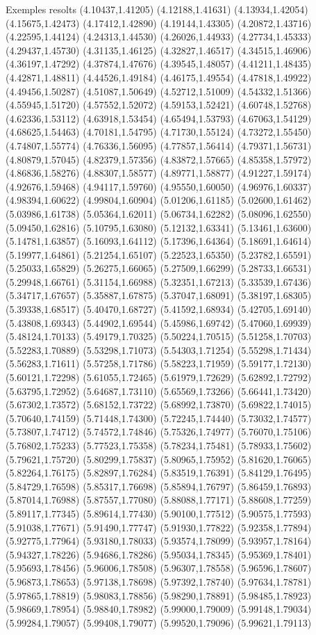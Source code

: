 \documentclass[11pt,a4paper]{article}
\begin{document}
\begin{fmex}{Exemples resolts}
(4.10437,1.41205) (4.12188,1.41631) (4.13934,1.42054) (4.15675,1.42473) (4.17412,1.42890) (4.19144,1.43305) (4.20872,1.43716) (4.22595,1.44124) (4.24313,1.44530) (4.26026,1.44933) (4.27734,1.45333) (4.29437,1.45730) (4.31135,1.46125) (4.32827,1.46517) (4.34515,1.46906) (4.36197,1.47292) (4.37874,1.47676) (4.39545,1.48057) (4.41211,1.48435) (4.42871,1.48811) (4.44526,1.49184) (4.46175,1.49554) (4.47818,1.49922) (4.49456,1.50287) (4.51087,1.50649) (4.52712,1.51009) (4.54332,1.51366) (4.55945,1.51720) (4.57552,1.52072) (4.59153,1.52421) (4.60748,1.52768) (4.62336,1.53112) (4.63918,1.53454) (4.65494,1.53793) (4.67063,1.54129) (4.68625,1.54463) (4.70181,1.54795) (4.71730,1.55124) (4.73272,1.55450) (4.74807,1.55774) (4.76336,1.56095) (4.77857,1.56414) (4.79371,1.56731) (4.80879,1.57045) (4.82379,1.57356) (4.83872,1.57665) (4.85358,1.57972) (4.86836,1.58276) (4.88307,1.58577) (4.89771,1.58877) (4.91227,1.59174) (4.92676,1.59468) (4.94117,1.59760) (4.95550,1.60050) (4.96976,1.60337) (4.98394,1.60622) (4.99804,1.60904) (5.01206,1.61185) (5.02600,1.61462) (5.03986,1.61738) (5.05364,1.62011) (5.06734,1.62282) (5.08096,1.62550) (5.09450,1.62816) (5.10795,1.63080) (5.12132,1.63341) (5.13461,1.63600) (5.14781,1.63857) (5.16093,1.64112) (5.17396,1.64364) (5.18691,1.64614) (5.19977,1.64861) (5.21254,1.65107) (5.22523,1.65350) (5.23782,1.65591) (5.25033,1.65829) (5.26275,1.66065) (5.27509,1.66299) (5.28733,1.66531) (5.29948,1.66761) (5.31154,1.66988) (5.32351,1.67213) (5.33539,1.67436) (5.34717,1.67657) (5.35887,1.67875) (5.37047,1.68091) (5.38197,1.68305) (5.39338,1.68517) (5.40470,1.68727) (5.41592,1.68934) (5.42705,1.69140) (5.43808,1.69343) (5.44902,1.69544) (5.45986,1.69742) (5.47060,1.69939) (5.48124,1.70133) (5.49179,1.70325) (5.50224,1.70515) (5.51258,1.70703) (5.52283,1.70889) (5.53298,1.71073) (5.54303,1.71254) (5.55298,1.71434) (5.56283,1.71611) (5.57258,1.71786) (5.58223,1.71959) (5.59177,1.72130) (5.60121,1.72298) (5.61055,1.72465) (5.61979,1.72629) (5.62892,1.72792) (5.63795,1.72952) (5.64687,1.73110) (5.65569,1.73266) (5.66441,1.73420) (5.67302,1.73572) (5.68152,1.73722) (5.68992,1.73870) (5.69822,1.74015) (5.70640,1.74159) (5.71448,1.74300) (5.72245,1.74440) (5.73032,1.74577) (5.73807,1.74712) (5.74572,1.74846) (5.75326,1.74977) (5.76070,1.75106) (5.76802,1.75233) (5.77523,1.75358) (5.78234,1.75481) (5.78933,1.75602) (5.79621,1.75720) (5.80299,1.75837) (5.80965,1.75952) (5.81620,1.76065) (5.82264,1.76175) (5.82897,1.76284) (5.83519,1.76391) (5.84129,1.76495) (5.84729,1.76598) (5.85317,1.76698) (5.85894,1.76797) (5.86459,1.76893) (5.87014,1.76988) (5.87557,1.77080) (5.88088,1.77171) (5.88608,1.77259) (5.89117,1.77345) (5.89614,1.77430) (5.90100,1.77512) (5.90575,1.77593) (5.91038,1.77671) (5.91490,1.77747) (5.91930,1.77822) (5.92358,1.77894) (5.92775,1.77964) (5.93180,1.78033) (5.93574,1.78099) (5.93957,1.78164) (5.94327,1.78226) (5.94686,1.78286) (5.95034,1.78345) (5.95369,1.78401) (5.95693,1.78456) (5.96006,1.78508) (5.96307,1.78558) (5.96596,1.78607) (5.96873,1.78653) (5.97138,1.78698) (5.97392,1.78740) (5.97634,1.78781) (5.97865,1.78819) (5.98083,1.78856) (5.98290,1.78891) (5.98485,1.78923) (5.98669,1.78954) (5.98840,1.78982) (5.99000,1.79009) (5.99148,1.79034) (5.99284,1.79057) (5.99408,1.79077) (5.99520,1.79096) (5.99621,1.79113) 
\end{fmex}
\end{document}
